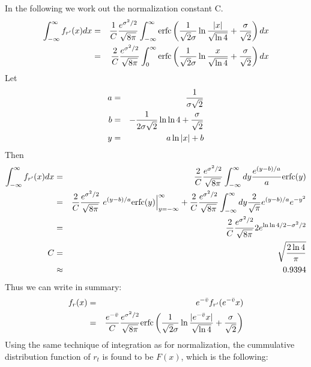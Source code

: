 \documentclass{book}
\begin{document}
In the following we work out the normalization constant C.
\begin{eqnarray*}
  \int_{-\infty}^{\infty} f_{r'}(x) dx &=& {1 \over C}{e^{\sigma^2 / 2} \over
    \sqrt{8\pi}} \int_{-\infty}^{\infty} \text{erfc} \left({1 \over
      \sqrt{2}\sigma} \ln{|x| \over \sqrt{\ln 4}} + {\sigma \over
      \sqrt{2}} \right) dx\\
  &=& {2 \over C}{e^{\sigma^2 / 2} \over
    \sqrt{8\pi}} \int_{0}^{\infty} \text{erfc} \left({1 \over
      \sqrt{2}\sigma} \ln{x \over \sqrt{\ln 4}} + {\sigma \over
      \sqrt{2}} \right) dx\\
\end{eqnarray*}
Let
\begin{eqnarray*}
  a &=& {1 \over \sigma \sqrt 2} \\
  b &=& -{1 \over 2 \sigma \sqrt 2}\ln\ln 4 + {\sigma \over \sqrt 2} \\
  y &=& a\ln|x|+b \\
\end{eqnarray*}
Then
\begin{eqnarray*}
  \int_{-\infty}^{\infty} f_{r'}(x) dx &=& {2 \over C}{e^{\sigma^2 / 2} \over
    \sqrt{8\pi}} \int_{-\infty}^{\infty} dy {e^{(y-b)/a} \over a}
  \text{erfc}(y) \\
  &=& {2 \over C}{e^{\sigma^2 / 2} \over
    \sqrt{8\pi}} \left.e^{(y-b)/a}
    \text{erfc}(y)\right|_{y=-\infty}^{\infty}
  + {2 \over C}{e^{\sigma^2 / 2} \over
    \sqrt{8\pi}} \int_{-\infty}^{\infty} dy {2 \over \sqrt \pi}
  e^{(y-b)/a} e^{-y^2} \\
  &=& {2 \over C}{e^{\sigma^2 / 2} \over \sqrt{8\pi}}  2 e^{\ln\ln 4/2
    - \sigma^2/2}\\
  C &=& \sqrt{2 \ln 4\over \pi} \\
  &\approx& 0.9394
\end{eqnarray*}
Thus we can write in summary:
\begin{eqnarray*}
  f_r(x) &=& e^{-\bar{v}} f_{r'}(e^{-\bar{v}} x) \\
    &=& {e^{-\bar{v}} \over C}{e^{\sigma^2 / 2} \over \sqrt{8\pi}}
    \text{erfc} \left({1 \over \sqrt{2}\sigma} \ln{|e^{-\bar{v}}x| \over \sqrt{\ln
          4}} + {\sigma \over \sqrt{2}}
    \right) \\
\end{eqnarray*}
Using the same technique of integration as for normalization, the
cummulative distribution function of $r_t$ is found to be $F(x)$,
which is the following:
\end{document}
